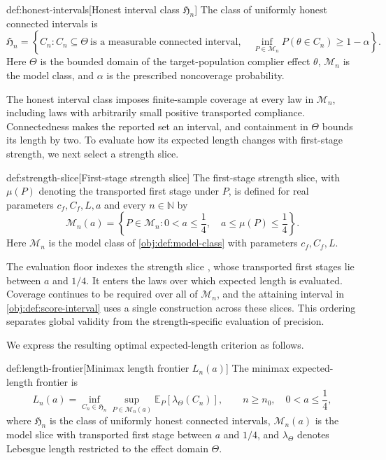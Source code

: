 \documentclass[11pt]{article}
\begin{document}
\begin{definitionv}{def:honest-intervals}[Honest interval class \(\mathfrak H_n\)]
The class of uniformly honest connected intervals is
\[
\mathfrak H_n=
\left\{
C_n:
C_n\subseteq\Theta\ \text{is a measurable connected interval},
\quad
\inf_{P\in\mathcal M_n}P(\theta\in C_n)\ge 1-\alpha
\right\}.
\]
Here \(\Theta\) is the bounded domain of the target-population complier effect \(\theta\), \(\mathcal M_n\) is the model class, and \(\alpha\) is the prescribed noncoverage probability.
\end{definitionv}

The honest interval class  imposes finite-sample coverage at every law in \(\mathcal M_n\), including laws with arbitrarily small positive transported compliance. Connectedness makes the reported set an interval, and containment in \(\Theta\) bounds its length by two. To evaluate how its expected length changes with first-stage strength, we next select a strength slice.

\begin{definitionv}{def:strength-slice}[First-stage strength slice]
The first-stage strength slice, with \(\mu(P)\) denoting the transported first stage under \(P\), is defined for real parameters \(c_f,C_f,L,a\) and every \(n\in\mathbb N\) by
\[
\mathcal M_n(a)
=
\left\{
P\in\mathcal M_n:
0<a\le\frac14,\quad
a\le\mu(P)\le\frac14
\right\}.
\]
Here \(\mathcal M_n\) is the model class of \cref{obj:def:model-class} with parameters \(c_f,C_f,L\).
\end{definitionv}

The evaluation floor  indexes the strength slice , whose transported first stages lie between \(a\) and \(1/4\). It enters the laws over which expected length is evaluated. Coverage continues to be required over all of \(\mathcal M_n\), and the attaining interval in \cref{obj:def:score-interval} uses a single construction across these slices. This ordering separates global validity from the strength-specific evaluation of precision.

We express the resulting optimal expected-length criterion as follows.

\begin{definitionv}{def:length-frontier}[Minimax length frontier \(L_n(a)\)]
The minimax expected-length frontier is
\[
L_n(a)
=
\inf_{C_n\in\mathfrak H_n}
\sup_{P\in\mathcal M_n(a)}
\mathbb E_P\!\left[\lambda_{\Theta}(C_n)\right],
\qquad n\ge n_0,\quad 0<a\le\frac14,
\]
where \(\mathfrak H_n\) is the class of uniformly honest connected intervals, \(\mathcal M_n(a)\) is the model slice with transported first stage between \(a\) and \(1/4\), and \(\lambda_{\Theta}\) denotes Lebesgue length restricted to the effect domain \(\Theta\).
\end{definitionv}
\end{document}
